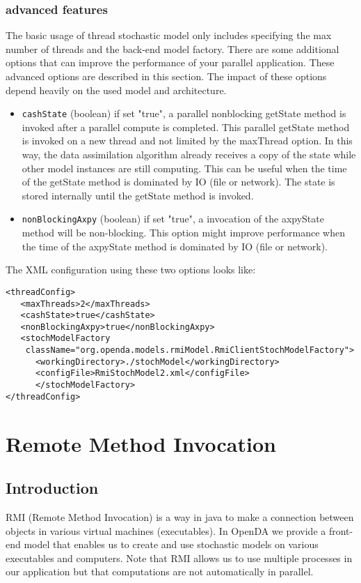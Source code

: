 \documentclass[12pt]{article}
\begin{document}
\subsubsection{advanced features}
The basic usage of thread stochastic model only includes specifying the max number of threads and the back-end model factory. There are some additional options that can improve the performance of your parallel application. These advanced options are described in this section. 
The impact of these options depend heavily on the used model and architecture.
\begin{itemize}
\item {\tt cashState} (boolean) if set "true", a parallel nonblocking getState method is invoked after a parallel compute is completed. This parallel getState method is invoked on a new thread and not limited by the maxThread option. In this way, the data assimilation algorithm already receives a copy of the state while other model instances are still computing. This can be useful when the time of the getState method is dominated by IO (file or network). The state is stored internally until the getState method is invoked.

\item{\tt nonBlockingAxpy} (boolean) if set "true", a invocation of the axpyState method will be non-blocking. This option might improve performance when the time of the axpyState method is dominated by IO (file or network).
\end{itemize} 

The XML configuration using these two options looks like:
{\small
\begin{verbatim}
<threadConfig>
   <maxThreads>2</maxThreads>
   <cashState>true</cashState>
   <nonBlockingAxpy>true</nonBlockingAxpy>
   <stochModelFactory 
    className="org.openda.models.rmiModel.RmiClientStochModelFactory">
      <workingDirectory>./stochModel</workingDirectory>
      <configFile>RmiStochModel2.xml</configFile>
      </stochModelFactory>
</threadConfig>
\end{verbatim}
}


\section{Remote Method Invocation}

\subsection{Introduction}
RMI (Remote Method Invocation) is a way in java to make a connection between objects in various virtual machines (executables). In OpenDA we provide a front-end model that enables us to create and use stochastic models on various executables and computers. Note that RMI allows us to use multiple processes in our application but that computations are not automatically in parallel.
\end{document}
